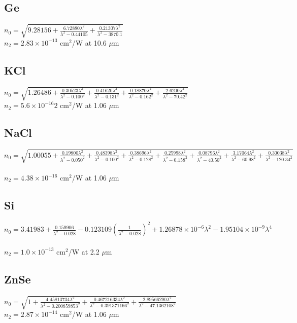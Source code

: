 \documentclass{report}
\begin{document}
\begin{appendices}
\subsection*{Ge}
$n_0=\sqrt{9.28156+\frac{6.72880\lambda^2}{\lambda^2-0.44105}+\frac{0.21307\lambda^2}{\lambda^2-3870.1}}$ \cite{Barnes-1979}\\
$n_2 = 2.83\times 10^{-13}$ cm$^2$/W at 10.6 $\mu$m \cite{Sheik-Bahae-1991}
\subsection*{KCl}
$n_0=\sqrt{1.26486+\frac{0.30523\lambda^2}{\lambda^2-0.100^2}+\frac{0.41620\lambda^2}{\lambda^2-0.131^2}+\frac{0.18870\lambda^2}{\lambda^2-0.162^2}+\frac{2.6200\lambda^2}{\lambda^2-70.42^2}}$ \cite{Li-1976}\\
$n_2 = 5.6 \times 10^{-16}2$ cm$^2$/W at 1.06 $\mu$m \cite{Sheik-Bahae-1991}
\subsection*{NaCl}
$n_0=\sqrt{1.00055+\frac{0.19800\lambda^2}{\lambda^2-0.050^2}+\frac{0.48398\lambda^2}{\lambda^2-0.100^2}+\frac{0.38696\lambda^2}{\lambda^2-0.128^2}+\frac{0.25998\lambda^2}{\lambda^2-0.158^2}+\frac{0.08796\lambda^2}{\lambda^2-40.50^2}+\frac{3.17064\lambda^2}{\lambda^2-60.98^2}+\frac{0.30038\lambda^2}{\lambda^2-120.34^2}}$ \cite{Li-1976}\\
$n_2 = 4.38\times 10^{-16}$ cm$^2$/W at 1.06 $\mu$m \cite{Sheik-Bahae-1991}
\subsection*{Si}
$n_0=3.41983+\frac{0.159906}{\lambda^2-0.028}-0.123109\left(\frac{1}{\lambda^2-0.028}\right)^2+1.26878\times 10^{-6}\lambda^2-1.95104\times 10^{-9}\lambda^4$ \cite{Edwards-1980}\\
$n_2 = 1.0\times 10^{-13}$ cm$^2$/W at 2.2 $\mu$m \cite{Bristow-2007}
\subsection*{ZnSe}
$n_0=\sqrt{1+\frac{4.45813734\lambda^2}{\lambda^2-0.200859853^2}+\frac{0.467216334\lambda^2}{\lambda^2-0.391371166^2}+\frac{2.89566290\lambda^2}{\lambda^2-47.1362108^2}}$ \cite{Tatian-1984}\\
$n_2 = 2.87\times 10^{-14}$ cm$^2$/W at 1.06 $\mu$m \cite{Sheik-Bahae-1991}


\end{appendices}



                          


                          
\end{document}
